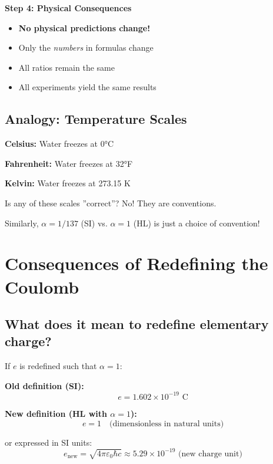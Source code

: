 	\textbf{Step 4: Physical Consequences}
	
	\begin{itemize}
		\item \textbf{No physical predictions change!}
		\item Only the \textit{numbers} in formulas change
		\item All ratios remain the same
		\item All experiments yield the same results
	\end{itemize}
	
	\subsection{Analogy: Temperature Scales}
	
	\textbf{Celsius:} Water freezes at 0°C
	
	\textbf{Fahrenheit:} Water freezes at 32°F
	
	\textbf{Kelvin:} Water freezes at 273.15 K
	
	Is any of these scales ''correct''? No! They are conventions.
	
	Similarly, $\alpha = 1/137$ (SI) vs. $\alpha = 1$ (HL) is just a choice of convention!
	
	\section{Consequences of Redefining the Coulomb}
	
	\subsection{What does it mean to redefine elementary charge?}
	
	If $e$ is redefined such that $\alpha = 1$:
	
	\textbf{Old definition (SI):}
	\begin{equation}
		e = 1.602 \times 10^{-19} \text{ C}
	\end{equation}
	
	\textbf{New definition (HL with $\alpha = 1$):}
	\begin{equation}
		e = 1 \quad \text{(dimensionless in natural units)}
	\end{equation}
	
	or expressed in SI units:
	\begin{equation}
		e_{\text{new}} = \sqrt{4\pi\varepsilon_0\hbar c} \approx 5.29 \times 10^{-19} \text{ (new charge unit)}
	\end{equation}
	
